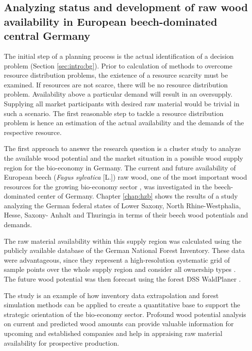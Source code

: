 \subsection{Analyzing status and development of raw wood availability in European beech-dominated central Germany}
\label{subsec:intro:struct:hzb}
The initial step of a planning process is the actual identification of a decision problem (Section \ref{sec:intro:bg}). Prior to calculation of methods to overcome resource distribution problems, the existence of a resource scarcity must be examined. If resources are not scarce, there will be no resource distribution problem. Availability above a particular demand will result in an oversupply. Supplying all market participants with desired raw material would be trivial in such a scenario. The first reasonable step to tackle a resource distribution problem is hence an estimation of the actual availability and the demands of the respective resource.

The first approach to answer the research question is a cluster study to analyze the available wood potential and the market situation in a possible wood supply region for the bio-economy in Germany. The current and future availability of European beech (\textit{Fagus sylvatica} [L.]) raw wood, one of the most important wood resources for the growing bio-economy sector \citep[p. 16]{auer_2016}, was investigated in the beech-dominated center of Germany. Chapter \ref{chap:hzb} shows the results of a study analyzing the German federal states of Lower Saxony, North Rhine-Westphalia, Hesse, Saxony- Anhalt and Thuringia in terms of their beech wood potentials and demands.

The raw material availability within this supply region was calculated using the publicly available database of the German National Forest Inventory. These data were advantageous, since they represent a high-resolution systematic grid of sample points over the whole supply region and consider all ownership types \citep{schmitz_2008}. The future wood potential was then forecast using the forest DSS WaldPlaner \citep{hansen_2014}.

The study is an example of how inventory data extrapolation and forest simulation methods can be applied to create a quantitative base to support the strategic orientation of the bio-economy sector. Profound wood potential analysis on current and predicted wood amounts can provide valuable information for upcoming and established companies and help in appraising raw material availability for prospective production.

